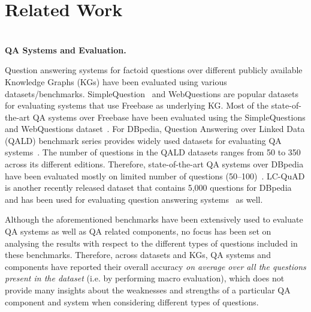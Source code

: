 \documentclass[sigconf,edbt]{acmart-edbt2019}
\begin{document}
\section{Related Work} \label{sec:relatedwork}
~\\
{\bf QA Systems and Evaluation.} \begin{inparaenum}
Question answering systems for factoid questions over different publicly available Knowledge Graphs (KGs) have been evaluated using various datasets/benchmarks. SimpleQuestion~\cite{DBLP:journals/corr/BordesUCW15} and WebQuestions \cite{DBLP:conf/emnlp/BerantCFL13} are popular datasets for evaluating systems that use Freebase as underlying KG. Most of the state-of-the-art QA systems over Freebase have been evaluated using the SimpleQuestions and WebQuestions dataset~\cite{DBLP:conf/emnlp/BerantCFL13,DBLP:conf/acl/DaiLX16,DBLP:conf/acl/YuYHSXZ17}. For DBpedia, Question Answering over Linked Data (QALD) benchmark series provides widely used datasets for evaluating QA systems~\cite{DBLP:conf/clef/UngerFLNCCW15}. The number of questions in the QALD datasets ranges from 50 to 350 across its different editions. Therefore, state-of-the-art QA systems over DBpedia have been evaluated mostly on limited number of questions (50--100)~\cite{DBLP:journals/pvldb/CuiXWSHW17,GERBILQA,DBLP:conf/sigmod/ZouHWYHZ14}. LC-QuAD \cite{trivedi2017lc} is another recently released dataset that contains 5,000 questions for DBpedia and has been used for evaluating question answering systems~\cite{diefenbach2018towards} as well. 

Although the aforementioned benchmarks have been extensively used to evaluate QA systems as well as QA related components, no focus has been set on analysing the results with respect to the different types of questions included in these benchmarks. Therefore, across datasets and KGs, QA systems and components have reported their overall accuracy \textit{on average over all the questions present in the dataset} (i.e. by performing macro evaluation), which does not provide many insights about the weaknesses and strengths of a particular QA component and system when considering different types of questions.
\end{inparaenum}
~\\
\end{document}
